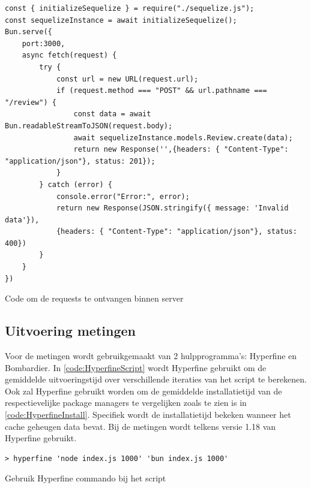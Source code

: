 \begin{listing}[H]
  \centering
  \begin{verbatim}
const { initializeSequelize } = require("./sequelize.js");
const sequelizeInstance = await initializeSequelize();
Bun.serve({
    port:3000,
    async fetch(request) {
        try {
            const url = new URL(request.url);
            if (request.method === "POST" && url.pathname === "/review") {
                const data = await Bun.readableStreamToJSON(request.body);
                await sequelizeInstance.models.Review.create(data);
                return new Response('',{headers: { "Content-Type": "application/json"}, status: 201});
            }
        } catch (error) {
            console.error("Error:", error);
            return new Response(JSON.stringify({ message: 'Invalid data'}), 
            {headers: { "Content-Type": "application/json"}, status: 400})
        }
    }
})
\end{verbatim}
\caption{\label{code:BunServer}Code om de requests te ontvangen binnen server}
\end{listing}
\subsection{Uitvoering metingen}
Voor de metingen wordt gebruikgemaakt van 2 hulpprogramma's: Hyperfine en Bombardier.
In \ref{code:HyperfineScript} wordt Hyperfine gebruikt om de gemiddelde uitvoeringstijd over verschillende iteraties van het script te berekenen.
Ook zal Hyperfine gebruikt worden om de gemiddelde installatietijd van de respectievelijke package managers te vergelijken zoals 
te zien is in \ref{code:HyperfineInstall}. Specifiek wordt de installatietijd bekeken wanneer het cache geheugen data bevat.
Bij de metingen wordt telkens versie 1.18 van Hyperfine gebruikt.
\begin{listing}[H]
  \centering
  \begin{verbatim}
> hyperfine 'node index.js 1000' 'bun index.js 1000'
      \end{verbatim}
      \caption{\label{code:HyperfineScript}Gebruik Hyperfine commando bij het script}
\end{listing}

